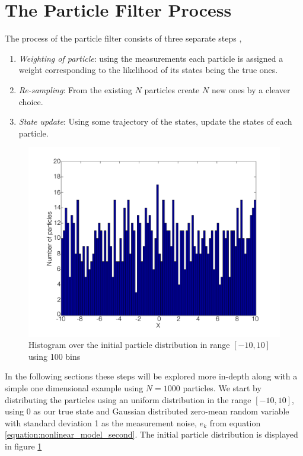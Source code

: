 \documentclass{LTHthesis}
\begin{document}
\section{The Particle Filter Process}
\label{sec:PF_process}
%
The process of the particle filter consists of three separate steps \cite{gson12}, 
\begin{enumerate}
\item \emph{Weighting of particle}: using the measurements each particle is assigned a weight corresponding to the likelihood of its states being the true ones.
\item \emph{Re-sampling}: From the existing $N$ particles create $N$ new ones by a cleaver choice.
\item \emph{State update}: Using some trajectory of the states, update the states of each particle.
\end{enumerate}
%
\begin{figure}[!hbt]

\includegraphics[width=1\textwidth ]{images/PF/hist_ini_dist}
\caption{Histogram over the initial particle distribution in range $[-10,10]$ using 100 bins}\label{hist_ini_dist}
\end{figure}
%
In the following sections these steps will be explored more in-depth along with a simple one dimensional example using $N=1000$ particles. We start by distributing the particles using an uniform distribution in the range $[-10,10]$, using $0$ as our true state and Gaussian distributed zero-mean random variable with standard deviation 1 as the measurement noise, $e_k$ from equation \ref{equation:nonlinear_model_second}. The initial particle distribution is displayed in figure  \ref{hist_ini_dist}
%
\end{document}
